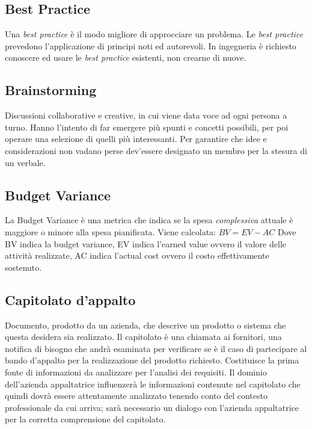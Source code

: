 	\subsection{Best Practice}
	\label{sec:bestpractice}
	Una \emph{best practice} è il modo migliore di approcciare un problema. Le \emph{best practice} prevedono l'applicazione di principi noti ed autorevoli. In ingegneria è richiesto conoscere ed usare le \emph{best practice} esistenti, non crearne di nuove.

	\subsection{Brainstorming}
	\label{sec:brainstorming}
	Discussioni collaborative e creative, in cui viene data voce ad ogni persona a turno. Hanno l'intento di far emergere più spunti e concetti possibili, per poi operare una selezione di quelli più interessanti. Per garantire che idee e considerazioni non vadano perse dev'essere designato un membro per la stesura di un verbale.

	\subsection{Budget Variance}
	\label{sec:budgetvariance}
	La Budget Variance è una metrica che indica se la spesa \textit{complessiva} attuale è maggiore o minore alla spesa pianificata. Viene calcolata: $BV = EV - AC$ Dove BV indica la budget variance, EV indica l'earned value ovvero il valore delle attività realizzate, AC indica l'actual cost ovvero il costo effettivamente sostenuto.
	\newpage


	\subsection{Capitolato d'appalto}
	\label{sec:capitolato}
	Documento, prodotto da un azienda, che descrive un prodotto o sistema che questa desidera sia realizzato. Il capitolato è una chiamata ai fornitori, una notifica di bisogno che andrà esaminata per verificare se è il caso di partecipare al bando d'appalto per la realizzazione del prodotto richiesto. Costituisce la prima fonte di informazioni da analizzare per l'analisi dei requisiti. Il dominio dell'azienda appaltatrice influenzerà le informazioni contenute nel capitolato che quindi dovrà essere attentamente analizzato tenendo conto del contesto professionale da cui arriva; sarà necessario un dialogo con l'azienda appaltatrice per la corretta comprensione del capitolato.

